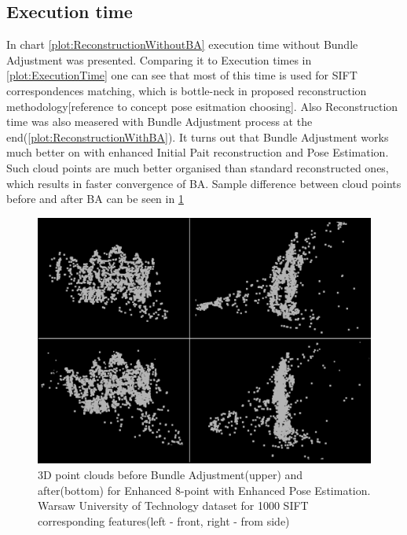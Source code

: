 \subsection{Execution time}
In chart \ref{plot:ReconstructionWithoutBA} execution time without Bundle Adjustment was presented. Comparing it to Execution times in \ref{plot:ExecutionTime} one can see that most of this time is used for SIFT correspondences matching, which is bottle-neck in proposed reconstruction methodology[reference to concept pose esitmation choosing]. Also Reconstruction time was also measered with Bundle Adjustment process at the end(\ref{plot:ReconstructionWithBA}). It turns out that Bundle Adjustment works much better on with enhanced Initial Pait reconstruction and Pose Estimation. Such cloud points are much better organised than standard reconstructed ones, which results in faster convergence of BA. Sample difference between cloud points before and after BA can be seen in \ref{fig:BundleAdjustmentComparison}
\begin{figure}[b!]
    \centering
    \includegraphics[width=\textwidth]{bundleAdjustmentComparison}
    \caption{3D point clouds before Bundle Adjustment(upper) and after(bottom) for Enhanced 8-point with Enhanced Pose Estimation. Warsaw University of Technology dataset for 1000 SIFT corresponding features(left - front, right - from side)}
    \label{fig:BundleAdjustmentComparison}
\end{figure}
